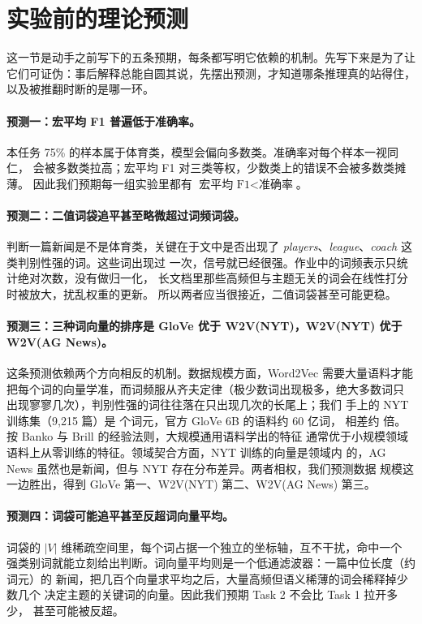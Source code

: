 \documentclass[11pt]{article}
\begin{document}
\section{实验前的理论预测}\label{sec:predictions}

这一节是动手之前写下的五条预期，每条都写明它依赖的机制。先写下来是为了让
它们可证伪：事后解释总能自圆其说，先摆出预测，才知道哪条推理真的站得住，
以及被推翻时断的是哪一环。

\paragraph{预测一：宏平均 F1 普遍低于准确率。}
本任务 75\% 的样本属于体育类，模型会偏向多数类。准确率对每个样本一视同仁，
会被多数类拉高；宏平均 F1 对三类等权，少数类上的错误不会被多数类摊薄。
因此我们预期每一组实验里都有 $\text{宏平均 F1} < \text{准确率}$。

\paragraph{预测二：二值词袋追平甚至略微超过词频词袋。}
判断一篇新闻是不是体育类，关键在于文中是否出现了
\emph{players}、\emph{league}、\emph{coach} 这类判别性强的词。这些词出现过
一次，信号就已经很强。作业中的词频表示只统计绝对次数，没有做归一化，
长文档里那些高频但与主题无关的词会在线性打分时被放大，扰乱权重的更新。
所以两者应当很接近，二值词袋甚至可能更稳。

\paragraph{预测三：三种词向量的排序是 GloVe 优于 W2V(NYT)，W2V(NYT) 优于
W2V(AG News)。}
这条预测依赖两个方向相反的机制。数据规模方面，Word2Vec 需要大量语料才能
把每个词的向量学准，而词频服从齐夫定律（极少数词出现极多，绝大多数词只
出现寥寥几次），判别性强的词往往落在只出现几次的长尾上；我们
手上的 NYT 训练集（9{,}215 篇）是 \resultTrainTokens{} 个词元，官方 GloVe 6B 的语料约 60 亿词，
相差约 \resultGloveRatio{} 倍。按 Banko 与 Brill 的经验法则\citep{banko2001}，大规模通用语料学出的特征
通常优于小规模领域语料上从零训练的特征。领域契合方面，NYT 训练的向量是领域内
的，AG News 虽然也是新闻，但与 NYT 存在分布差异。两者相权，我们预测数据
规模这一边胜出，得到 GloVe 第一、W2V(NYT) 第二、W2V(AG News) 第三。

\paragraph{预测四：词袋可能追平甚至反超词向量平均。}
词袋的 $|V|$ 维稀疏空间里，每个词占据一个独立的坐标轴，互不干扰，命中一个
强类别词就能立刻给出判断。词向量平均则是一个低通滤波器：一篇中位长度（约 \resultMedianTokens{} 词元）的
新闻，把几百个向量求平均之后，大量高频但语义稀薄的词会稀释掉少数几个
决定主题的关键词的向量。因此我们预期 Task 2 不会比 Task 1 拉开多少，
甚至可能被反超。
\end{document}
